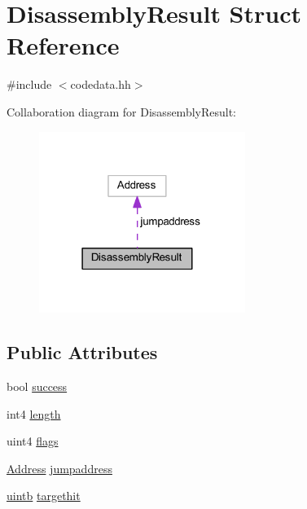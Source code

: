 \hypertarget{struct_disassembly_result}{}\section{Disassembly\+Result Struct Reference}
\label{struct_disassembly_result}


{\ttfamily \#include $<$codedata.\+hh$>$}



Collaboration diagram for Disassembly\+Result\+:
\nopagebreak
\begin{figure}[H]
\begin{center}
\leavevmode
\includegraphics[width=190pt]{struct_disassembly_result__coll__graph}
\end{center}
\end{figure}
\subsection*{Public Attributes}
\begin{DoxyCompactItemize}
\item 
bool \mbox{\hyperlink{struct_disassembly_result_a461520ce7ea2e8db1e2eeaba39f6a104}{success}}
\item 
int4 \mbox{\hyperlink{struct_disassembly_result_a40f1a3bd43478be9ae3029c15a656495}{length}}
\item 
uint4 \mbox{\hyperlink{struct_disassembly_result_af848ddf0a7556f24164e2d8063ad4341}{flags}}
\item 
\mbox{\hyperlink{class_address}{Address}} \mbox{\hyperlink{struct_disassembly_result_aebea0a6685b8fd448cf906f661758932}{jumpaddress}}
\item 
\mbox{\hyperlink{types_8h_a2db313c5d32a12b01d26ac9b3bca178f}{uintb}} \mbox{\hyperlink{struct_disassembly_result_ad38937f35c1f1a11450f6e7d36c69851}{targethit}}
\end{DoxyCompactItemize}


